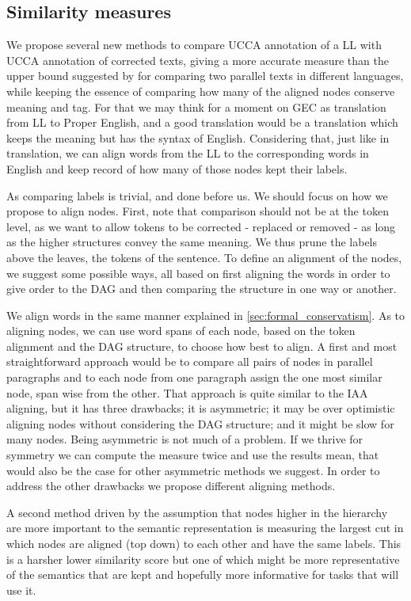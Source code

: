 \documentclass[letter,11pt]{article}
\begin{document}
\subsection{Similarity measures\label{subsec:Similarity-measures}}

We propose several new methods to compare UCCA annotation of a LL with UCCA annotation of corrected texts, giving a more accurate
measure than the upper bound suggested by \cite{sulem2015conceptual} for
comparing two parallel texts in different languages, while keeping
the essence of comparing how many of the aligned nodes conserve meaning and tag. For that we may think for a moment on GEC as
translation from LL to Proper English, and a good translation
would be a translation which keeps the meaning but has the syntax
of English. Considering that, just like in translation, we can align words from the LL to the corresponding words in English
and keep record of how many of those nodes kept their labels.

As comparing labels is trivial, and done before us. We should focus on how we propose to align nodes. 
First, note that comparison should not be at
the token level, as we want to allow tokens to be corrected - replaced or removed -
as long as the higher structures convey the same meaning. We thus
prune the labels above the leaves, the tokens of the sentence. To
define an alignment of the nodes, we suggest some possible ways, all
based on first aligning the words in order to give order to the DAG and then comparing the structure in one way or another.

We align words in the same manner explained in \ref{sec:formal_conservatism}.
As to aligning nodes, we can use word spans of each node, based on
the token alignment and the DAG structure, to choose how best to align.
A first and most straightforward approach would be to compare all
pairs of nodes in parallel paragraphs and to each node from one paragraph
assign the one most similar node, span wise from the other. That approach
is quite similar to the IAA aligning, but it
has three drawbacks; it is asymmetric; it may be over optimistic aligning
nodes without considering the DAG structure; and it might be
slow for many nodes. Being asymmetric is not much of a problem. If we thrive for symmetry
we can compute the measure twice and use the results mean,
that would also be the case for other asymmetric methods we suggest.
In order to address the other drawbacks we propose different aligning methods.

A second method driven by the assumption that nodes higher in the
hierarchy are more important to the semantic representation is measuring
the largest cut in which nodes are aligned (top down) to each other
and have the same labels. This is a harsher lower similarity
score but one of which might be more representative of the semantics
that are kept and hopefully more informative for tasks that will use it.
\end{document}
